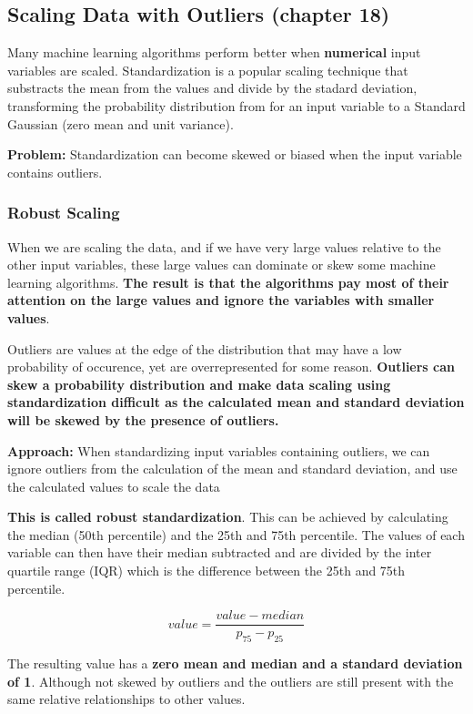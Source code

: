 \documentclass{article}
\begin{document}
\subsection{Scaling Data with Outliers (chapter 18)}
Many machine learning algorithms perform better when \textbf{numerical} input variables are scaled. Standardization is a popular scaling technique that substracts the mean from the values and divide by the stadard deviation, transforming the probability distribution from for an input variable to a Standard Gaussian (zero mean and unit variance).

\noindent \textbf{Problem:} Standardization can become skewed or biased when the input variable contains outliers.

\subsubsection*{Robust Scaling}
When we are scaling the data, and if we have very large values relative to the other input variables, these large values can dominate or skew some machine learning algorithms. \textbf{The result is that the algorithms pay most of their attention on the large values and ignore the variables with smaller values}.

\noindent Outliers are values at the edge of the distribution that may have a low probability of occurence, yet are overrepresented for some reason. \textbf{Outliers can skew a probability distribution and make data scaling using standardization difficult as the calculated mean and standard deviation will be skewed by the presence of outliers.}

\noindent \textbf{Approach:} When standardizing input variables containing outliers, we can ignore outliers from the calculation of the mean and standard deviation, and use the calculated values to scale the data

\noindent \textbf{This is called robust standardization}. This can be achieved by calculating the median (50th percentile) and the 25th and 75th percentile. The values of each variable can then have their median subtracted and are divided by the inter quartile range (IQR) which is the difference between the 25th and 75th percentile.

\begin{equation}
value = \frac{value - median}{p_{75} - p_{25}}
\end{equation}

The resulting value has a \textbf{zero mean and median and a standard deviation of 1}. Although not skewed by outliers and the outliers are still present with the same relative relationships to other values.
\end{document}
